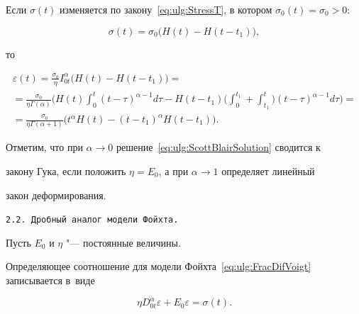 Если $\sigma(t)$ изменяется по закону~\eqref{eq:ulg:StressT}, в котором $\sigma_{0}(t)=\sigma_{0}>0$:

\begin{equation}\label{eq:ulg:StressConst}

\sigma(t)=\sigma_{0}\bigl(H(t)-H(t-t_{1})\bigr),

\end{equation}

то

\begin{multline}\label{eq:ulg:ScottBlairSolution}

\varepsilon(t)=\frac{\sigma_{0}}{\eta}I_{0t}^{\alpha} \bigl( H(t)-H(t-t_{1})\bigr)

= 

\\

=\frac{\sigma_{0}}{\eta\Gamma(\alpha)} \biggl(H(t)\int _{0}^{t}(t-\tau)^{\alpha-1}d\tau

-H(t-t_{1}) \biggl(\int _{0}^{t_{1}}+\int _{t_{1}}^{t} \biggr)(t-\tau)^{\alpha-1}d\tau \biggr)=

\\

= \frac{\sigma_{0}}{\eta \Gamma (\alpha+1)} \bigl(t^{\alpha}H(t)-(t-t_{1})^{\alpha}H(t-t_{1})\bigr).

\end{multline}



Отметим, что при $\alpha\rightarrow 0$ решение~\eqref{eq:ulg:ScottBlairSolution} сводится к

закону Гука, если положить $\eta=E_{0}$, а при $\alpha\rightarrow 1$ определяет линейный

закон деформирования.



\smallskip



 \texttt{2.2. Дробный аналог модели Фойхта.} 

 Пусть $E_{0}$ и $\eta$ "--- постоянные величины. 

 Определяющее соотношение для модели Фойхта~\eqref{eq:ulg:FracDifVoigt} записывается в~виде

\begin{equation}\label{eq:ulg:FracDifVoigt2}

\eta D_{0t}^{\alpha}\varepsilon+E_{0}\varepsilon=\sigma(t).

\end{equation}



